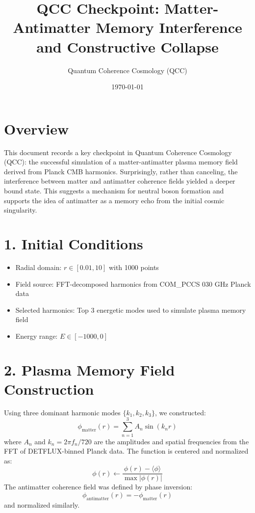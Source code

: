 \documentclass[12pt]{article}
\title{QCC Checkpoint: Matter-Antimatter Memory Interference and Constructive Collapse}
\author{Quantum Coherence Cosmology (QCC)}
\date{\today}
\begin{document}
\maketitle

\section*{Overview}
This document records a key checkpoint in Quantum Coherence Cosmology (QCC): the successful simulation of a matter-antimatter plasma memory field derived from Planck CMB harmonics. Surprisingly, rather than canceling, the interference between matter and antimatter coherence fields yielded a deeper bound state. This suggests a mechanism for neutral boson formation and supports the idea of antimatter as a memory echo from the initial cosmic singularity.

\section*{1. Initial Conditions}
\begin{itemize}
  \item Radial domain: $r \in [0.01, 10]$ with 1000 points
  \item Field source: FFT-decomposed harmonics from COM\_PCCS 030 GHz Planck data
  \item Selected harmonics: Top 3 energetic modes used to simulate plasma memory field
  \item Energy range: $E \in [-1000, 0]$
\end{itemize}

\section*{2. Plasma Memory Field Construction}
Using three dominant harmonic modes $\{k_1, k_2, k_3\}$, we constructed:
\[
\phi_\text{matter}(r) = \sum_{n=1}^3 A_n \sin(k_n r)
\]
where $A_n$ and $k_n = 2\pi f_n / 720$ are the amplitudes and spatial frequencies from the FFT of DETFLUX-binned Planck data. The function is centered and normalized as:
\[
\phi(r) \leftarrow \frac{\phi(r) - \langle \phi \rangle}{\max |\phi(r)|}
\]
The antimatter coherence field was defined by phase inversion:
\[
\phi_\text{antimatter}(r) = -\phi_\text{matter}(r)
\]
and normalized similarly.
\end{document}
